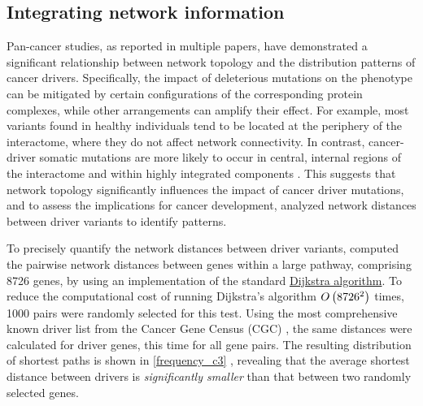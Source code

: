\subsection{Integrating network information} \label{network_info}

Pan-cancer studies, as reported in multiple papers, have demonstrated a significant relationship between network topology and the distribution patterns of cancer drivers. Specifically, the impact of deleterious mutations on the phenotype can be mitigated by certain configurations of the corresponding protein complexes, while other arrangements can amplify their effect. For example, most variants found in healthy individuals tend to be located at the periphery of the interactome, where they do not affect network connectivity. In contrast, cancer-driver somatic mutations are more likely to occur in central, internal regions of the interactome and within highly integrated components \cite{c3}. This suggests that network topology significantly influences the impact of cancer driver mutations, and to assess the implications for cancer development, \textcite{c3} analyzed network distances between driver variants to identify patterns.

To precisely quantify the network distances between driver variants, \textcite{c3} computed the pairwise network distances between genes within a large pathway, comprising 8726 genes, by using an implementation of the standard \href{https://en.wikipedia.org/wiki/Dijkstra%27s_algorithm}{Dijkstra algorithm}. To reduce the computational cost of running Dijkstra's algorithm $O\left(8726^2\right)$ times, 1000 pairs were randomly selected for this test. Using the most comprehensive known driver list from the Cancer Gene Census (CGC) \cite{cgc}, the same distances were calculated for driver genes, this time for all gene pairs. The resulting distribution of shortest paths is shown in \cref{frequency_c3} \cite{c3}, revealing that the average shortest distance between drivers is \textit{significantly smaller} than that between two randomly selected genes.

